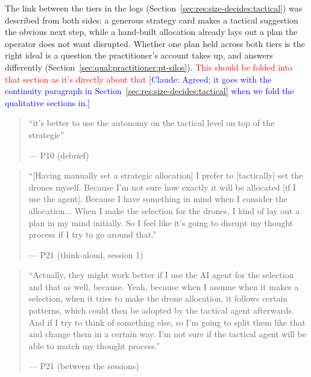 
\label{sec:qual:hierarchy:one-plan}
The link between the tiers in the logs (Section~\ref{sec:res:size-decides:tactical}) was described from both sides: a generous strategy card makes a tactical suggestion the obvious next step, while a hand-built allocation already lays out a plan the operator does not want disrupted. Whether one plan held across both tiers is the right ideal is a question the practitioner's account takes up, and answers differently (Section~\ref{sec:qual:practitioner:pt-silos}).
\textcolor{red}{This should be folded into that section as it's directly about that}
\textcolor{blue}{[Claude: Agreed; it goes with the continuity paragraph in Section~\ref{sec:res:size-decides:tactical} when we fold the qualitative sections in.]}

\begin{quote}\small
``it's better to use the autonomy on the tactical level on top of the strategic''\par\hfill--- P10 (debrief)
\end{quote}

\begin{quote}\small
``[Having manually set a strategic allocation] I prefer to [tactically] set the drones myself. Because I'm not sure how exactly it will be allocated [if I use the agent]. Because I have something in mind when I consider the allocation... When I make the selection for the drones, I kind of lay out a plan in my mind initially. So I feel like it's going to disrupt my thought process if I try to go around that.''\par\hfill--- P21 (think-aloud, session 1)
\end{quote}

\begin{quote}\small
``Actually, they might work better if I use the AI agent for the selection and that as well, because. Yeah, because when I assume when it makes a selection, when it tries to make the drone allocation, it follows certain patterns, which could then be adopted by the tactical agent afterwards. And if I try to think of something else, so I'm going to split them like that and change them in a certain way. I'm not sure if the tactical agent will be able to match my thought process.''\par\hfill--- P21 (between the sessions)
\end{quote}


